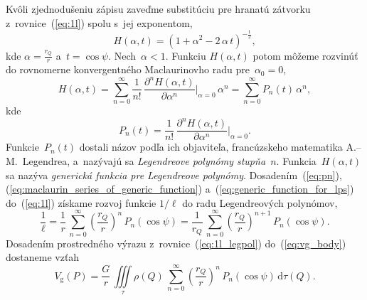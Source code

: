 \documentclass[a4paper, 12pt]{book}
\newcommand{\diff}{\mathrm d}
\newcommand{\gidx}{\mathrm g}
\begin{document}
Kvôli zjednodušeniu zápisu zaveďme substitúciu pre hranatú zátvorku
z~rovnice~(\ref{eq:1l}) spolu s~jej exponentom,
%
\begin{equation}
\label{eq:generic_function_for_lps}
H(\alpha, t) = \left(1 + \alpha^2 - 2 \, \alpha\, t \right)^{-\frac{1}{2}}{,}
\end{equation}
%
kde $\alpha = \frac{r_Q}{r}$ a~$t = \cos\psi$.  Nech~$\alpha < 1$.  Funkciu
$H(\alpha, t)$ potom môžeme rozvinúť do rovnomerne konvergentného Maclaurinovho
radu pre~$\alpha_0 = 0$,
%
\begin{equation}
\label{eq:maclaurin_series_of_generic_function}
H(\alpha, t) = \sum_{n = 0}^\infty \frac{1}{n!} \, \frac{\partial^n H(\alpha,
t)}{\partial \alpha^n} \bigg\lvert_{\alpha = 0} \, \alpha^n = \sum_{n 
= 0}^\infty P_n(t) \, \alpha^n{,}
\end{equation}
%
kde
%
\begin{equation}
\label{eq:pn}
P_n(t) = \frac{1}{n!} \, \frac{\partial^n H(\alpha, t)}{\partial \alpha^n} 
\bigg\lvert_{\alpha = 0}{.}
\end{equation}
%
Funkcie~$P_n(t)$ dostali názov podľa ich objaviteľa, francúzskeho matematika
A.--M.~Legendrea, a~nazývajú sa \emph{Legendreove polynómy
stupňa~$n$}.  Funkcia~$H(\alpha, t)$ sa nazýva \emph{generická funkcia pre
Legendreove polynómy}.  Dosadením~(\ref{eq:pn}),
(\ref{eq:maclaurin_series_of_generic_function}) 
a~(\ref{eq:generic_function_for_lps}) do~(\ref{eq:1l}) získame rozvoj funkcie 
$1 \slash \ell$ do radu Legendreových polynómov,
%
\begin{equation}
\label{eq:1l_legpol}
\frac{1}{\ell} = \frac{1}{r} \, \sum_{n = 0}^\infty \left( \frac{r_Q}{r} 
\right)^{n} \, P_n(\cos\psi) = \frac{1}{r_Q} \, \sum_{n = 0}^\infty \left( 
\frac{r_Q}{r} \right)^{n + 1} \, P_n(\cos\psi){.}
\end{equation}
%
Dosadením prostredného výrazu z~rovnice~(\ref{eq:1l_legpol}) 
do~(\ref{eq:vg_body})
dostaneme vzťah
%
\begin{equation}
\label{eq:vg_legpol}
V_\gidx(P) = \frac{G}{r} \, \iiint\limits_{\tau} \rho(Q) \, \sum_{n 
= 0}^{\infty} \left( \frac{r_Q}{r} \right)^n \, P_n(\cos\psi) \, 
\diff\tau(Q){.}
\end{equation}
\end{document}
